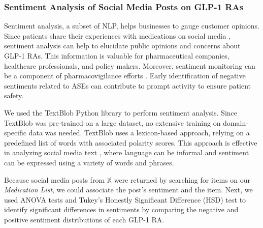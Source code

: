 \documentclass[referee,bst/sn-basic]{sn-jnl}%
\theoremstyle{thmstyletwo}%
\theoremstyle{thmstylethree}%
\begin{document}
\subsubsection{Sentiment Analysis of Social Media Posts on GLP-1 RAs}
\label{sec:sentiment}
Sentiment analysis, a subset of NLP, helps businesses to gauge customer opinions. 
Since patients share their experiences with medications on social media \cite{grasser2018aspect,korkontzelos2016analysis}, 
sentiment analysis can help to elucidate public opinions and concerns about GLP-1 RAs.
This information is valuable for pharmaceutical companies, healthcare professionals, and policy makers. 
Moreover, sentiment monitoring can be a component of pharmacovigilance efforts \cite{sarker2015utilizing,gosal2015opinion}. 
Early identification of negative sentiments related to ASEs can contribute to prompt activity to ensure patient safety.

We used the TextBlob Python library \cite{loria2018textblob} to perform sentiment analysis.
Since TextBlob was pre-trained on a large dataset, no extensive training on domain-specific data was needed.
TextBlob uses a lexicon-based approach, relying on a predefined list of words with associated polarity scores. 
This approach is effective in analyzing social media text \cite{verma2018sentiment}, 
where language can be informal and sentiment can be expressed using a variety of words and phrases.

Because social media posts from $\mathbb{X}$ were returned by searching for items on our \textit{Medication List}, we could associate the post's sentiment and the item.
Next, we used ANOVA tests \cite{cardinal2013anova} 
and Tukey's Honestly Significant Difference (HSD) test \cite{abdi2010tukey} 
to identify significant differences in sentiments by comparing the negative and positive sentiment distributions of each GLP-1 RA.

\end{document}
